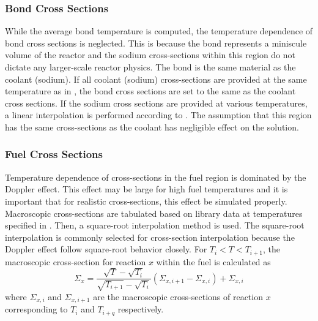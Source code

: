     \subsubsection{Bond Cross Sections}
      While the average bond temperature is computed, the temperature dependence
      of bond cross sections is neglected. This is because the bond represents a
      miniscule volume of the reactor and the sodium cross-sections within this
      region do not dictate any larger-scale reactor physics. The bond is the 
      same material as the coolant (sodium). If all coolant (sodium) 
      cross-sections are provided at the same temperature as in 
      , the bond cross sections are set to the same as the 
      coolant cross sections. If the sodium cross sections are provided at
      various temperatures, a linear interpolation is performed according to
      . The assumption that this region has the
      same cross-sections as the coolant has negligible effect on the solution.

    \subsubsection{Fuel Cross Sections}
      Temperature dependence of cross-sections in the fuel region is dominated
      by the Doppler effect. This effect may be large for high fuel temperatures
      and it is important that for realistic cross-sections, this effect be
      simulated properly. Macroscopic cross-sections are tabulated based on
      library data at temperatures specified in . Then, a
      square-root interpolation method is used. The square-root interpolation is
      commonly selected for cross-section interpolation because the Doppler
      effect follow square-root behavior closely. For $T_i < T < T_{i+1}$, the
      macroscopic cross-section for reaction $x$ within the fuel is calculated
      as
      \begin{equation}
        \Sigma_{x} = 
          \frac{\sqrt{T} - \sqrt{T_{i}}}{\sqrt{T_{i+1}}-\sqrt{T_{i}}}
          (\Sigma_{x,i+1} - \Sigma_{x,i})  + \Sigma_{x,i}
      \end{equation}
      where $\Sigma_{x,i}$ and $\Sigma_{x,i+1}$ are the macroscopic
      cross-sections of reaction $x$ corresponding to $T_i$ and $T_{i+q}$
      respectively.
      

